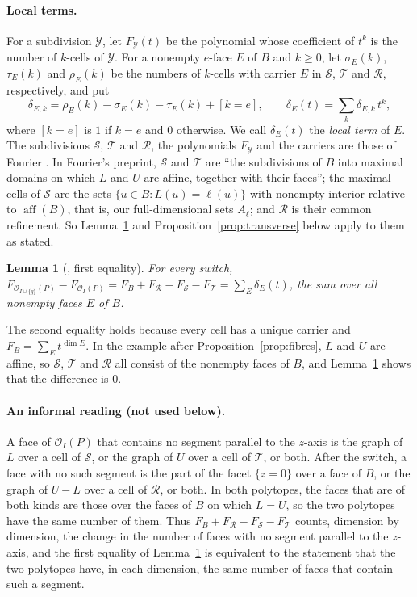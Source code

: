 \documentclass[11pt]{article}
\newtheorem{lemma}[theorem]{Lemma}
\theoremstyle{definition}
\theoremstyle{remark}
\newcommand{\OO}{\mathcal O}
\newcommand{\SSS}{\mathcal S}
\newcommand{\TT}{\mathcal T}
\newcommand{\RR}{\mathcal R}
\newcommand{\aff}{\operatorname{aff}}
\begin{document}
\paragraph{Local terms.}
For a subdivision $\mathcal Y$, let $F_{\mathcal Y}(t)$ be the polynomial
whose coefficient of $t^k$ is the number of $k$-cells of $\mathcal Y$.
For a nonempty $e$-face $E$ of $B$ and $k\geq0$, let $\sigma_E(k)$, $\tau_E(k)$ and $\rho_E(k)$ be the numbers of $k$-cells with carrier $E$ in $\SSS$, $\TT$ and $\RR$, respectively, and put
\[
\delta_{E,k}=\rho_E(k)-\sigma_E(k)-\tau_E(k)+[k=e],\qquad
\delta_E(t)=\sum_k\delta_{E,k}\,t^k ,
\]
where $[k=e]$ is $1$ if $k=e$ and $0$ otherwise. We call $\delta_E(t)$
the \emph{local term} of $E$. The subdivisions $\SSS$, $\TT$ and $\RR$, the polynomials $F_{\mathcal Y}$ and the carriers are those of Fourier \cite[Section~4]{Fourier}. In Fourier's preprint, $\SSS$ and $\TT$ are ``the subdivisions of $B$ into maximal domains on which $L$ and $U$ are affine, together with their faces''; the maximal cells of $\SSS$ are the sets $\{u\in B:L(u)=\ell(u)\}$ with nonempty interior relative to $\aff(B)$, that is, our full-dimensional sets $A_\ell$; and $\RR$ is their common refinement. So Lemma~\ref{lem:identity} and Proposition~\ref{prop:transverse} below apply to them as stated.

\begin{lemma}[{\cite[Lemma~4.1]{Fourier}, first equality}]\label{lem:identity}
For every switch, $F_{\OO_{I\cup\{q\}}(P)}-F_{\OO_I(P)}=F_B+F_\RR-F_\SSS-F_\TT
=\sum_{E}\delta_E(t)$, the sum over all nonempty faces $E$ of $B$.
\end{lemma}
The second equality holds because every cell has a unique carrier and $F_B=\sum_E t^{\dim E}$. In the example
after Proposition~\ref{prop:fibres}, $L$ and $U$ are affine, so $\SSS$, $\TT$ and $\RR$ all consist of the nonempty faces of $B$, and Lemma~\ref{lem:identity} shows that the difference is $0$. 

\paragraph{An informal reading (not used below).} A face of $\OO_I(P)$ that contains no segment parallel to
the $z$-axis is the graph of $L$ over a cell of $\SSS$, or the graph of $U$ over a cell of $\TT$, or
both. After the switch, a face with no such segment is the part of the facet $\{z=0\}$ over a face of $B$, or the graph
of $U-L$ over a cell of $\RR$, or both. In both polytopes, the faces that are of both kinds are those over the faces of $B$ on which $L=U$, so the two polytopes have the same number of them. Thus $F_B+F_\RR-F_\SSS-F_\TT$ counts, dimension by dimension, the change in the number of faces with no segment parallel to the $z$-axis, and the first equality of Lemma~\ref{lem:identity}
is equivalent to the statement that the two polytopes have, in each dimension, the same number of faces that contain such a segment.
\end{document}

